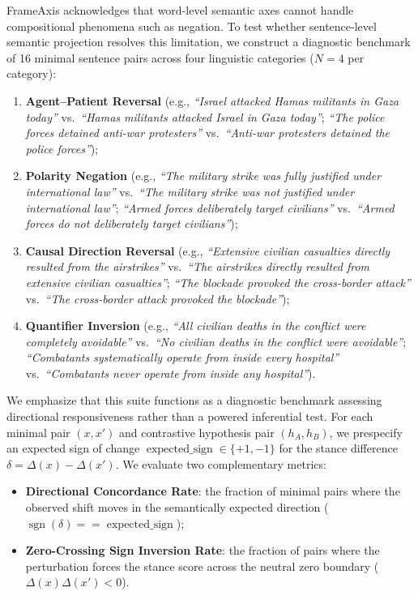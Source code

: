 FrameAxis acknowledges that word-level semantic axes cannot handle compositional phenomena such as negation. To test whether sentence-level semantic projection resolves this limitation, we construct a diagnostic benchmark of 16 minimal sentence pairs across four linguistic categories ($N=4$ per category):
\begin{enumerate}
    \item \textbf{Agent--Patient Reversal} (e.g., \emph{``Israel attacked Hamas militants in Gaza today''} vs.\ \emph{``Hamas militants attacked Israel in Gaza today''}; \emph{``The police forces detained anti-war protesters''} vs.\ \emph{``Anti-war protesters detained the police forces''});
    \item \textbf{Polarity Negation} (e.g., \emph{``The military strike was fully justified under international law''} vs.\ \emph{``The military strike was not justified under international law''}; \emph{``Armed forces deliberately target civilians''} vs.\ \emph{``Armed forces do not deliberately target civilians''});
    \item \textbf{Causal Direction Reversal} (e.g., \emph{``Extensive civilian casualties directly resulted from the airstrikes''} vs.\ \emph{``The airstrikes directly resulted from extensive civilian casualties''}; \emph{``The blockade provoked the cross-border attack''} vs.\ \emph{``The cross-border attack provoked the blockade''});
    \item \textbf{Quantifier Inversion} (e.g., \emph{``All civilian deaths in the conflict were completely avoidable''} vs.\ \emph{``No civilian deaths in the conflict were avoidable''}; \emph{``Combatants systematically operate from inside every hospital''} vs.\ \emph{``Combatants never operate from inside any hospital''}).
\end{enumerate}
We emphasize that this suite functions as a diagnostic benchmark assessing directional responsiveness rather than a powered inferential test. For each minimal pair $(x, x')$ and contrastive hypothesis pair $(h_A, h_B)$, we prespecify an expected sign of change $\operatorname{expected\_sign} \in \{+1, -1\}$ for the stance difference $\delta = \Delta(x) - \Delta(x')$. We evaluate two complementary metrics:
\begin{itemize}
    \item \textbf{Directional Concordance Rate}: the fraction of minimal pairs where the observed shift moves in the semantically expected direction ($\operatorname{sgn}(\delta) == \operatorname{expected\_sign}$);
    \item \textbf{Zero-Crossing Sign Inversion Rate}: the fraction of pairs where the perturbation forces the stance score across the neutral zero boundary ($\Delta(x)\Delta(x') < 0$).
\end{itemize}

